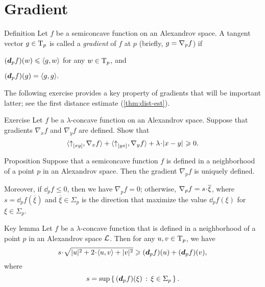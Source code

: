 \section{Gradient}\label{sec:grad-def}

\begin{thm}{Definition}\label{def:grad} 
Let $f$ be a semiconcave function on an Alexandrov space.
A tangent vector $g\in \mathrm{T}_p$ is called a 
\emph{gradient} of $f$ at $p$ 
(briefly,  $g\z=\nabla_p f$\index{$\nabla$}) if
\begin{subthm}{}
$(\bm{d}_p f)(w)\leqslant \langle g,w\rangle$ for any $w\in \mathrm{T}_p$, and
\end{subthm}

\begin{subthm}{}
$(\bm{d}_p f)(g) = \langle g,g\rangle.$
\end{subthm}
\end{thm}

The following exercise provides a key property of gradients that will be important latter;
see the first distance estimate (\ref{thm:dist-est}).

\begin{thm}{Exercise}\label{ex:monotonicity}
Let $f$ be a $\lambda$-concave function on an Alexandrov space.
Suppose that gradients $\nabla_xf$ and $\nabla_yf$ are defined.
Show that 
\[\<\dir{x}{y},\nabla_{x}f\>
+
\<\dir{y}{x},\nabla_{y}f\>
+
\lambda\cdot\dist{x}{y}{}\ge 0.\]
\end{thm}



\begin{thm}{Proposition}\label{prop:grad-exist}
Suppose that a semiconcave function $f$ is defined in a neighborhood of a point $p$ in an Alexandrov space.
Then the gradient $\nabla_pf$ is uniquely defined.

Moreover, if $\dd_pf\le 0$, then we have $\nabla_pf=0$;
otherwise, $\nabla_pf\z=s\cdot \overline{\xi}$, where 
$s= \dd_pf(\overline{\xi})$
and
$\overline{\xi}\in \Sigma_p$ is the direction that maximize the value $\dd_pf(\xi)$ for $\xi\in \Sigma_p$.
\end{thm}


\begin{thm}{Key lemma}\label{lem:ohta} 
Let $f$ be a $\lambda$-concave function that is defined in a neighborhood of a point $p$
in an Alexandrov space $\mathcal{L}$. 
Then for any $u,v\in \mathrm{T}_p$, we have
\[s\cdot \sqrt{|u|^2+2\cdot\<u,v\> +|v|^2}
\ge 
(\dd_p f)(u)+(\dd_p f)(v),\]
where
\[s=\sup\left\{\,{(\bm{d}_p f)(\xi)}\,:\,{\xi\in\Sigma_p}\,\right\}.\]

\end{thm}

